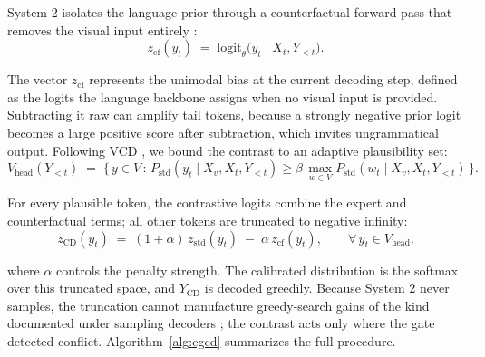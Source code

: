 \documentclass[pdflatex,sn-basic,Numbered]{sn-jnl}
\theoremstyle{thmstyleone}
\theoremstyle{thmstyletwo}
\theoremstyle{thmstylethree}
\begin{document}
System 2 isolates the language prior through a counterfactual forward pass that removes the visual input entirely \cite{favero2024multi}:
\begin{equation}\label{eq:cf}
z_{\text{cf}}(y_{t}) \;=\; \text{logit}_{\theta}\bigl(y_{t} \mid X_{t}, Y_{<t}\bigr).
\end{equation}

The vector $z_{\text{cf}}$ represents the unimodal bias at the current decoding step, defined as the logits the language backbone assigns when no visual input is provided. Subtracting it raw can amplify tail tokens, because a strongly negative prior logit becomes a large positive score after subtraction, which invites ungrammatical output. Following VCD \cite{leng2024mitigating}, we bound the contrast to an adaptive plausibility set:
\begin{equation}\label{eq:head}
V_{\text{head}}(Y_{<t}) \;=\; \bigl\{\, y \in V \,:\, P_{\text{std}}(y_{t} \mid X_{v}, X_{t}, Y_{<t}) \geq \beta\, \max_{w \in V} P_{\text{std}}(w_{t} \mid X_{v}, X_{t}, Y_{<t})\,\bigr\}.
\end{equation}

For every plausible token, the contrastive logits combine the expert and counterfactual terms; all other tokens are truncated to negative infinity:
\begin{equation}\label{eq:cd}
z_{\text{CD}}(y_{t}) \;=\; (1 + \alpha)\, z_{\text{std}}(y_{t}) \;-\; \alpha\, z_{\text{cf}}(y_{t}), \qquad \forall\, y_{t} \in V_{\text{head}}.
\end{equation}

where $\alpha$ controls the penalty strength. The calibrated distribution is the softmax over this truncated space, and $Y_{\text{CD}}$ is decoded greedily. Because System 2 never samples, the truncation cannot manufacture greedy-search gains of the kind documented under sampling decoders \cite{yin2025mirage,bendre2026rethinking}; the contrast acts only where the gate detected conflict. Algorithm~\ref{alg:egcd} summarizes the full procedure.
\end{document}
